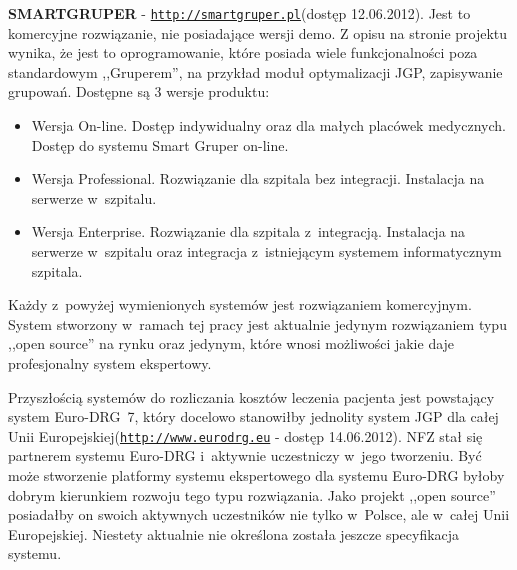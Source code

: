 \textbf{SMARTGRUPER} - \underline{\texttt{http://smartgruper.pl}}(dostęp 12.06.2012). Jest to komercyjne rozwiązanie, nie posiadające wersji demo. Z opisu na stronie projektu wynika, że jest to oprogramowanie, które posiada wiele funkcjonalności poza standardowym ,,Gruperem'', na przykład moduł optymalizacji JGP, zapisywanie grupowań. Dostępne są 3 wersje produktu:
\begin{itemize}
 \item Wersja On-line. Dostęp indywidualny oraz dla małych placówek medycznych. Dostęp do systemu Smart Gruper on-line.
 \item Wersja Professional. Rozwiązanie dla szpitala bez integracji. Instalacja na serwerze w~szpitalu.
 \item Wersja Enterprise. Rozwiązanie dla szpitala z~integracją. Instalacja na serwerze w~szpitalu oraz integracja z~istniejącym systemem informatycznym szpitala.
\end{itemize}

Każdy z~powyżej wymienionych systemów jest rozwiązaniem komercyjnym. System stworzony w~ramach tej pracy jest aktualnie jedynym rozwiązaniem typu ,,open source'' na rynku oraz jedynym, które wnosi możliwości jakie daje profesjonalny system ekspertowy.

Przyszłością systemów do rozliczania kosztów leczenia pacjenta jest powstający system \mbox{Euro-DRG~7}, który docelowo stanowiłby jednolity system JGP dla całej Unii Europejskiej(\underline{\texttt{http://www.eurodrg.eu}} - dostęp 14.06.2012).
NFZ stał się partnerem systemu Euro-DRG i~aktywnie uczestniczy w~jego tworzeniu. Być może stworzenie platformy systemu ekspertowego dla systemu Euro-DRG byłoby dobrym kierunkiem rozwoju tego typu rozwiązania. Jako projekt ,,open source'' posiadałby on swoich aktywnych uczestników nie tylko w~Polsce, ale w~całej Unii Europejskiej. Niestety aktualnie nie określona została jeszcze specyfikacja systemu. 

